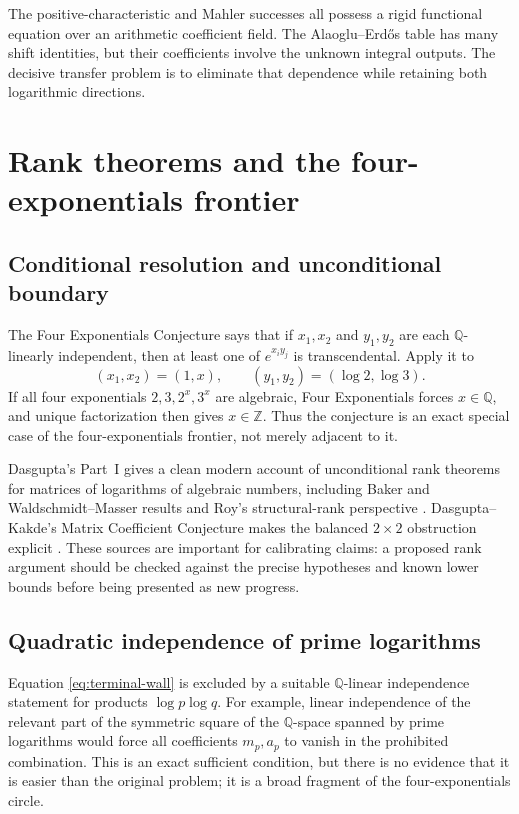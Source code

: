 \documentclass[10pt,letterpaper]{article}
\newcommand{\Q}{\mathbb Q}
\newcommand{\Z}{\mathbb Z}
\begin{document}
\begin{takeawaybox}
The positive-characteristic and Mahler successes all possess a rigid functional equation
over an arithmetic coefficient field.  The Alaoglu--Erd\H{o}s table has many shift identities,
but their coefficients involve the unknown integral outputs.  The decisive transfer problem
is to eliminate that dependence while retaining both logarithmic directions.
\end{takeawaybox}

\section{Rank theorems and the four-exponentials frontier}
\label{sec:rank}

\subsection{Conditional resolution and unconditional boundary}

The Four Exponentials Conjecture says that if \(x_1,x_2\) and \(y_1,y_2\) are each
\(\Q\)-linearly independent, then at least one of \(e^{x_i y_j}\) is transcendental.  Apply
it to
\[
  (x_1,x_2)=(1,x),
  \qquad
  (y_1,y_2)=(\log2,\log3).
\]
If all four exponentials \(2,3,2^x,3^x\) are algebraic, Four Exponentials forces
\(x\in\Q\), and unique factorization then gives \(x\in\Z\).  Thus the conjecture is an exact
special case of the four-exponentials frontier, not merely adjacent to it.

Dasgupta's Part~I gives a clean modern account of unconditional rank theorems for matrices of
logarithms of algebraic numbers, including Baker and Waldschmidt--Masser results and Roy's
structural-rank perspective \cite{DasguptaPartI}.  Dasgupta--Kakde's Matrix Coefficient
Conjecture makes the balanced \(2\times2\) obstruction explicit
\cite{DasguptaKakdePartII}.  These sources are important for calibrating claims: a proposed
rank argument should be checked against the precise hypotheses and known lower bounds before
being presented as new progress.

\subsection{Quadratic independence of prime logarithms}

Equation \cref{eq:terminal-wall} is excluded by a suitable \(\Q\)-linear independence
statement for products \(\log p\log q\).  For example, linear independence of the relevant
part of the symmetric square of the \(\Q\)-space spanned by prime logarithms would force all
coefficients \(m_p,a_p\) to vanish in the prohibited combination.  This is an exact
sufficient condition, but there is no evidence that it is easier than the original problem;
it is a broad fragment of the four-exponentials circle.
\end{document}
